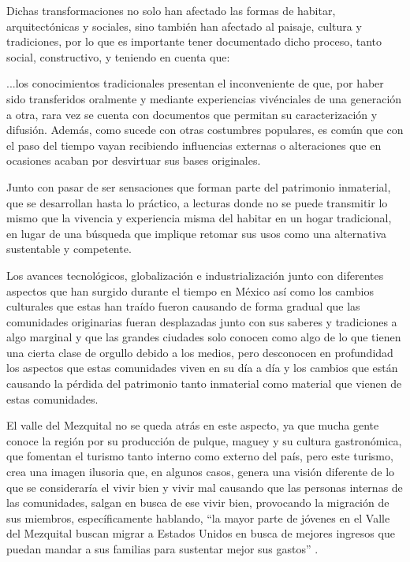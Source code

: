 Dichas transformaciones no solo han afectado las formas de habitar, arquitectónicas y sociales, sino también han afectado al paisaje, cultura y tradiciones, por lo que es importante tener documentado dicho proceso, tanto social, constructivo, y teniendo en cuenta que: 

\begin{center}
    \begin{minipage}{0.9\linewidth}
        \vspace{4pt}%
        {\small...los conocimientos tradicionales presentan el inconveniente de que, por haber sido transferidos oralmente y mediante experiencias vivénciales de una generación a otra, rara vez se cuenta con documentos que permitan su caracterización y difusión. Además, como sucede con otras costumbres populares, es común que con el paso del tiempo vayan recibiendo influencias externas o alteraciones que en ocasiones acaban por desvirtuar sus bases originales.
        }
        \begin{flushright}
            \citep[p. 182]{guerrero2007arquitectura}
        \end{flushright}
        \vspace{4pt}%
    \end{minipage}
\end{center}

Junto con pasar de ser sensaciones que forman parte del patrimonio inmaterial, que se desarrollan hasta lo práctico, a lecturas donde no se puede transmitir lo mismo que la vivencia y experiencia misma del habitar en un hogar tradicional, en lugar de una búsqueda que implique retomar sus usos como una alternativa sustentable y competente.

Los avances tecnológicos, globalización e industrialización junto con diferentes aspectos que han surgido durante el tiempo en México así como los cambios culturales que estas han traído fueron causando de forma gradual que las comunidades originarias fueran desplazadas junto con sus saberes y tradiciones a algo marginal y que las grandes ciudades solo conocen como algo de lo que tienen una cierta clase de orgullo debido a los medios, pero desconocen en profundidad los aspectos que estas comunidades viven en su día a día y los cambios que están causando la pérdida del patrimonio tanto inmaterial como material que vienen de estas comunidades. 

El valle del Mezquital no se queda atrás en este aspecto, ya que mucha gente conoce la región por su producción de pulque, maguey y su cultura gastronómica, que fomentan el turismo tanto interno como externo del país, pero este turismo, crea una imagen ilusoria que, en algunos casos, genera una visión diferente de lo que se consideraría el vivir bien y vivir mal causando que las personas internas de las comunidades, salgan en busca de ese vivir bien, provocando la migración de sus miembros, específicamente hablando, ``la mayor parte de jóvenes en el Valle del Mezquital buscan migrar a Estados Unidos en busca de mejores ingresos que puedan mandar a sus familias para sustentar mejor sus gastos'' \citep{baez2012pueblos}.

